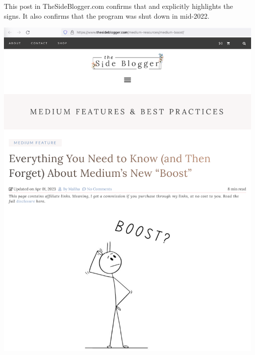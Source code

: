 This post in TheSideBlogger.com confirms that and explicitly highlights the signs.
It also confirms that the program was shut down in mid-2022.

\begin{center}
    \includegraphics[width=38em]{thesideblogger-p1}
\end{center}
\WillContinue
\pagebreak

